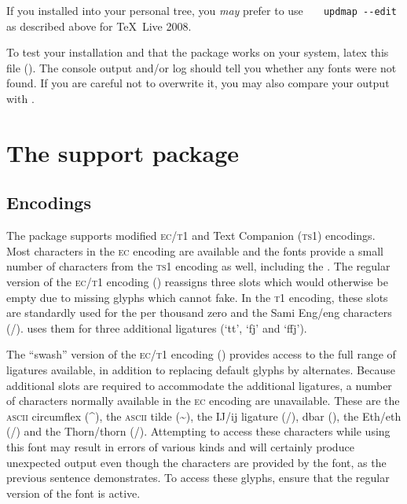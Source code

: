 \documentclass[11pt,british]{article}
\begin{document}
If you installed into your personal tree, you \emph{may} prefer to use \verb|	updmap --edit| as described above for \TeX~Live 2008.

To test your installation and that the package works on your system, latex this file (). The console output and/or log should tell you whether any fonts were not found. If you are careful not to overwrite it, you may also compare your output with .

\section{The support package}\label{sec:support}

\subsection{Encodings}

The package supports modified \textsc{ec}/\textsc{t1} and Text Companion (\textsc{ts1}) encodings. Most characters in the \textsc{ec} encoding are available and the fonts provide a small number of characters from the \textsc{ts1} encoding as well, including the \texteuro. The regular version of the \textsc{ec}/\textsc{t1} encoding () reassigns three slots which would otherwise be empty due to missing glyphs which  cannot fake. In the \textsc{t1} encoding, these slots are standardly used for the per thousand zero and the Sami Eng/eng characters (\NG/\ng).  uses them for three additional ligatures (`\textsf{tt}', `\textsf{fj}' and `\textsf{ffj}').

The ``swash'' version of the \textsc{ec}/\textsc{t1} encoding () provides access to the full range of ligatures available, in addition to replacing default glyphs by alternates. Because additional slots are required to accommodate the additional ligatures, a number of characters normally available in the \textsc{ec} encoding are unavailable. These are the \textsc{ascii} circumflex (\textsf{\textasciicircum}), the \textsc{ascii} tilde (\textsf{\textasciitilde}), the IJ/ij ligature (\textsf\IJ/\textsf\ij), dbar (\textsf\dj), the Eth/eth (\textsf\DH/\textsf\dh) and the Thorn/thorn (\textsf\TH/\textsf\th). Attempting to access these characters while using this font may result in errors of various kinds and will certainly produce unexpected output even though the characters are provided by the font, as the previous sentence demonstrates. To access these glyphs, ensure that the regular version of the font is active.
\end{document}
